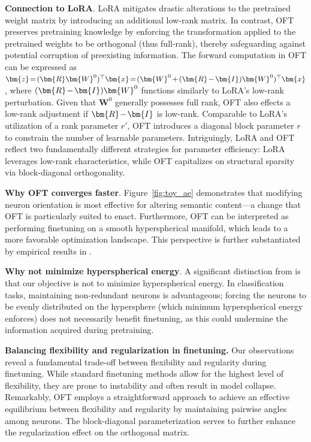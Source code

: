 \textbf{Connection to LoRA}. LoRA mitigates drastic alterations to the pretrained weight matrix by introducing an additional low-rank matrix. In contrast, OFT preserves pretraining knowledge by enforcing the transformation applied to the pretrained weights to be orthogonal (thus full-rank), thereby safeguarding against potential corruption of preexisting information. The forward computation in OFT can be expressed as $\thickmuskip=2mu \medmuskip=2mu \bm{z}=(\bm{R}\bm{W}^0)^\top\bm{x}=(\bm{W}^0+(\bm{R}-\bm{I})\bm{W}^0)^\top\bm{x}$, where $\thickmuskip=2mu \medmuskip=2mu (\bm{R}-\bm{I})\bm{W}^0$ functions similarly to LoRA's low-rank perturbation. Given that $\bm{W}^0$ generally possesses full rank, OFT also effects a low-rank adjustment if $\thickmuskip=2mu \medmuskip=2mu \bm{R}-\bm{I}$ is low-rank. Comparable to LoRA’s utilization of a rank parameter $r'$, OFT introduces a diagonal block parameter $r$ to constrain the number of learnable parameters. Intriguingly, LoRA and OFT reflect two fundamentally different strategies for parameter efficiency: LoRA leverages low-rank characteristics, while OFT capitalizes on structural sparsity via block-diagonal orthogonality.

\textbf{Why OFT converges faster}. Figure~\ref{fig:toy_ae} demonstrates that modifying neuron orientation is most effective for altering semantic content—a change that OFT is particularly suited to enact. Furthermore, OFT can be interpreted as performing finetuning on a smooth hyperspherical manifold, which leads to a more favorable optimization landscape. This perspective is further substantiated by empirical results in \cite{liu2021orthogonal}.

\textbf{Why not minimize hyperspherical energy}. A significant distinction from \cite{liu2021orthogonal} is that our objective is not to minimize hyperspherical energy. In classification tasks, maintaining non-redundant neurons is advantageous; forcing the neurons to be evenly distributed on the hypersphere (which minimum hyperspherical energy enforces) does not necessarily benefit finetuning, as this could undermine the information acquired during pretraining.

\textbf{Balancing flexibility and regularization in finetuning.} Our observations reveal a fundamental trade-off between flexibility and regularity during finetuning. While standard finetuning methods allow for the highest level of flexibility, they are prone to instability and often result in model collapse. Remarkably, OFT employs a straightforward approach to achieve an effective equilibrium between flexibility and regularity by maintaining pairwise angles among neurons. The block-diagonal parameterization serves to further enhance the regularization effect on the orthogonal matrix.

